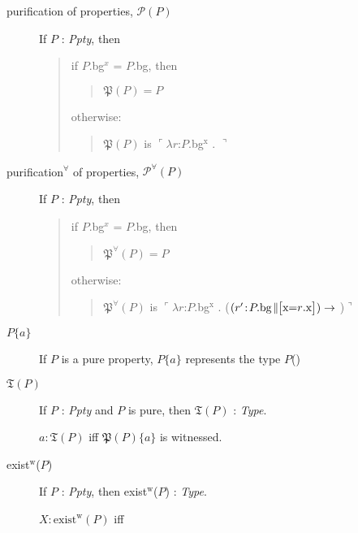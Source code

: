 \begin{description}
        \begin{description}
        
      \item[purification of properties, \textnormal{$\mathcal{P}(P)$}]\mbox{}

        If $P$ : \textit{Ppty}, then
\begin{quote}
if $P$.bg$^x$ = $P$.bg, then
\begin{quote}
$\mathfrak{P}(P)=P$
\end{quote}
otherwise:
\begin{quote}
$\mathfrak{P}(P)$ is $\ulcorner\lambda r$:$P$.bg$^{\text{x}}$
. $\urcorner$
\end{quote}
\end{quote}
\item[purification$^\forall$ of properties, \textnormal{$\mathcal{P}^\forall(P)$}]\mbox{}

  If $P$ : \textit{Ppty}, then
\begin{quote}
if $P$.bg$^x$ = $P$.bg, then
\begin{quote}
$\mathfrak{P^\forall}(P)=P$
\end{quote}
otherwise:
\begin{quote}
$\mathfrak{P^\forall}(P)$ is $\ulcorner\lambda r$:$P$.bg$^{\text{x}}$
. ($(r'\!:\!P.\text{bg}\!\parallel\!\!\text{\smallrecord{\field{x}{$r$.x}}})\rightarrow$
)$\urcorner$
\end{quote}
\end{quote}
\item[\textnormal{$P\{a\}$}] \mbox{}

  If $P$ is a pure property, $P\{a\}$
  represents the type $P$()

\item[\textnormal{$\mathfrak{T}(P)$}] \mbox{}

  If $P$ : \textit{Ppty} and $P$ is pure, then $\mathfrak{T}(P)$ : \textit{Type}.

  $a:\mathfrak{T}(P)$ iff $\mathfrak{P}(P)\{a\}$ is witnessed.
  
\item[\textnormal{exist$^{\text{w}}$($P$)}] \mbox{}

  If $P$ : \textit{Ppty}, then exist$^{\text{w}}$($P$) :
  \textit{Type}.

  $X:\text{exist}^{\text{w}}(P)$ iff
\begin{enumerate} 
 

\end{enumerate}
\end{description}
\end{description}
